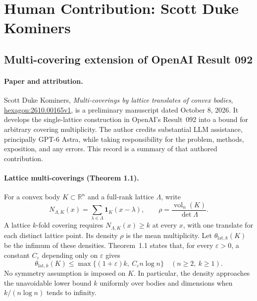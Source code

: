 \documentclass[11pt]{article}
\begin{document}
\section*{Human Contribution: Scott Duke Kominers}

\subsection*{Multi-covering extension of OpenAI Result 092}

\paragraph{Paper and attribution.}
Scott Duke Kominers, \emph{Multi-coverings by lattice translates of convex bodies},
\href{https://hexagonmath.org/2610.00165v1}{hexagon:2610.00165v1},
is a preliminary manuscript dated October 8, 2026.
It develops the single-lattice construction in OpenAI's Result~092 into a
bound for arbitrary covering multiplicity. The author credits substantial
LLM assistance, principally GPT-6 Astra, while taking responsibility for
the problem, methods, exposition, and any errors. This record is a summary
of that authored contribution.

\paragraph{Lattice multi-coverings (Theorem 1.1).}
For a convex body $K\subset\mathbb R^n$ and a full-rank lattice $\Lambda$,
write
\[
 N_{\Lambda,K}(x)=\sum_{\lambda\in\Lambda}\mathbf 1_K(x-\lambda),
 \qquad
 \rho=\frac{\operatorname{vol}_n(K)}{\det\Lambda}.
\]
A lattice $k$-fold covering requires $N_{\Lambda,K}(x)\geq k$ at every
$x$, with one translate for each distinct lattice point. Its density
$\rho$ is the mean multiplicity. Let $\theta_{\mathrm{lat},k}(K)$
be the infimum of these densities. Theorem~1.1 states that, for every
$\varepsilon>0$, a constant $C_\varepsilon$ depending only on
$\varepsilon$ gives
\[
 \theta_{\mathrm{lat},k}(K)
 \leq \max\{(1+\varepsilon)k,\ C_\varepsilon n\log n\}
 \quad(n\geq2,\ k\geq1).
\]
No symmetry assumption is imposed on $K$. In particular, the density
approaches the unavoidable lower bound $k$ uniformly over bodies and
dimensions when $k/(n\log n)$ tends to infinity.
\end{document}
